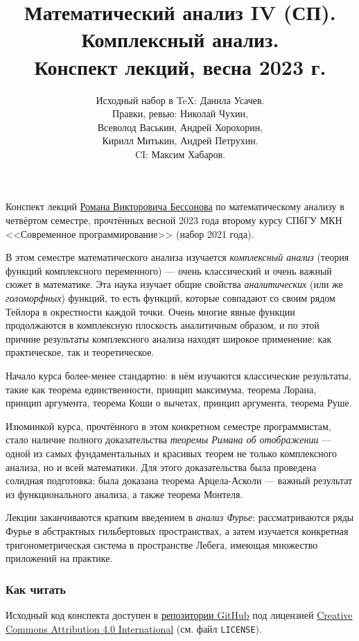 \documentclass[a4paper,14pt]{extarticle}
\title{Математический анализ IV (СП). \\ Комплексный анализ. \\ Конспект лекций, весна 2023 г.}
\author{Исходный набор в \TeX: Данила Усачев. \\ Правки, ревью: Николай Чухин, \\ Всеволод Васькин, Андрей Хорохорин, \\ Кирилл Митькин, Андрей Петрухин. \\ CI: Максим Хабаров.}
\date{}
\theoremstyle{definition}
\theoremstyle{plain}
\theoremstyle{plain}
\theoremstyle{plain}
\theoremstyle{plain}
\theoremstyle{definition}
\theoremstyle{definition}
\theoremstyle{definition}
\theoremstyle{definition}
\theoremstyle{definition}
\theoremstyle{definition}
\theoremstyle{definition}
\theoremstyle{definition}
\theoremstyle{definition}
\theoremstyle{definition}
\theoremstyle{definition}
\theoremstyle{plain}
\theoremstyle{plain}
\theoremstyle{plain}
\theoremstyle{plain}
\theoremstyle{definition}
\theoremstyle{definition}
\theoremstyle{definition}
\theoremstyle{definition}
\theoremstyle{definition}
\theoremstyle{definition}
\begin{document}
\maketitle
Конспект лекций \href{https://math-cs.spbu.ru/people/bessonov-r-v/}{\color{blue}Романа Викторовича Бессонова} по математическому анализу в четвёртом семестре, прочтённых весной 2023 года второму курсу СПбГУ МКН <<Современное программирование>> (набор 2021 года).

В этом семестре математического анализа изучается \emph{комплексный анализ} (теория функций комплексного переменного) --- очень классический и очень важный сюжет в математике. Эта наука изучает общие свойства \emph{аналитических} (или же \emph{голоморфных}) функций, то есть функций, которые совпадают со своим рядом Тейлора в окрестности каждой точки. Очень многие явные функции продолжаются в комплексную плоскость аналитичным образом, и по этой причине результаты комплексного анализа находят широкое применение: как практическое, так и теоретическое.

Начало курса более-менее стандартно: в нём изучаются классические результаты, такие как теорема единственности, принцип максимума, теорема Лорана, принцип аргумента, теорема Коши о вычетах, принцип аргумента, теорема Руше.

Изюминкой курса, прочтённого в этом конкретном семестре программистам, стало наличие полного доказательства \emph{теоремы Римана об отображении} --- одной из самых фундаментальных и красивых теорем не только комплексного анализа, но и всей математики. Для этого доказательства была проведена солидная подготовка: была доказана теорема Арцела-Асколи --- важный результат из функционального анализа, а также теорема Монтеля.

Лекции заканчиваются кратким введением в \emph{анализ Фурье}: рассматриваются ряды Фурье в абстрактных гильбертовых пространствах, а затем изучается конкретная тригонометрическая система в пространстве Лебега, имеющая множество приложений на практике.

\newpage
\subsubsection*{Как читать}
Исходный код конспекта доступен в  \href{https://github.com/koreshaSp/matan2/releases}{\color{blue}репозитории GitHub} под лицензией \href{https://creativecommons.org/licenses/by/4.0/}{\color{blue}Creative Commons Attribution 4.0 International} (см. файл \texttt{LICENSE}).
\end{document}
